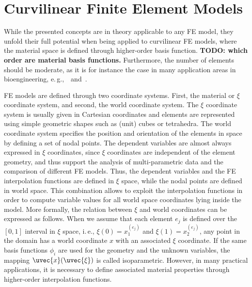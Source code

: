\documentclass[review,journal]{vgtc}         %
\begin{document}
\section{Curvilinear Finite Element Models}\label{sec:theory}

While the presented concepts are in theory applicable to any FE model, they unfold their full potential when being applied to curvilinear FE models, where the material space is defined through higher-order basis function. \textbf{TODO: which order are material basis functions.} Furthermore, the number of elements should be moderate, as it is for instance the case in many application areas in bioengineering, e.\,g.,~\cite{wuensche03deformation}~and~\cite{lee10deformation}.

FE models are defined through two coordinate systems. First, the material or $\xi$ coordinate system, and second, the world coordinate system. The $\xi$ coordinate system is usually given in Cartesian coordinates and elements are represented using simple geometric shapes such as (unit) cubes or tetrahedra. The world coordinate system specifies the position and orientation of the elements in space by defining a set of nodal points. The dependent variables are almost always expressed in $\xi$ coordinates, since $\xi$ coordinates are independent of the element geometry, and thus support the analysis of multi-parametric data and the comparison of different FE models. Thus, the dependent variables and the FE interpolation functions are defined in $\xi$ space, while the nodal points are defined in world space. This combination allows to exploit the interpolation functions in order to compute variable values for all world space coordinates lying inside the model. More formally, the relation between $\xi$ and world coordinates can be expressed as follows. When we assume that each element $e_j$ is defined over the $[0,1]$ interval in $\xi$ space, i.\,e., $\xi(0)=x^{(e_j)}_1$ and $\xi(1)=x^{(e_j)}_2$, any point in the domain has a world coordinate $x$ with an associated $\xi$ coordinate. If the same basis functions $\phi_i$ are used for the geometry and the unknown variables, the mapping $\uvec{x}(\uvec{\xi})$ is called isoparametric. However, in many practical applications, it is necessary to define associated material properties through higher-order interpolation functions.
\end{document}
